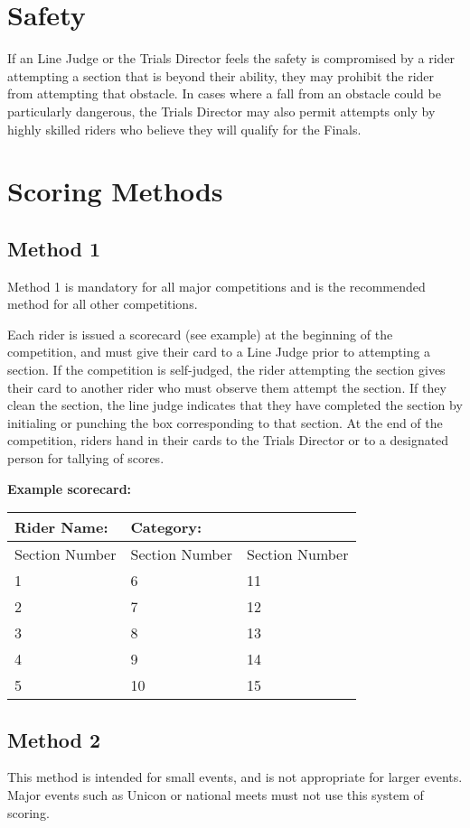 \section{Safety}

If an Line Judge or the Trials Director feels the safety is compromised by a rider attempting a section that is beyond their ability, they may prohibit the rider from attempting that obstacle.
In cases where a fall from an obstacle could be particularly dangerous, the Trials Director may also permit attempts only by highly skilled riders who believe they will qualify for the Finals.

\section{Scoring Methods}

\subsection{Method 1}
Method 1 is mandatory for all major competitions and is the recommended method for all other competitions.

Each rider is issued a scorecard (see example) at the beginning of the competition, and must give their card to a Line Judge prior to attempting a section.
If the competition is self-judged, the rider attempting the section gives their card to another rider who must observe them attempt the section.
If they clean the section, the line judge indicates that they have completed the section by initialing or punching the box corresponding to that section.
At the end of the competition, riders hand in their cards to the Trials Director or to a designated person for tallying of scores.

\textbf{Example scorecard:}

\begin{tabular}{|l|l|l|}
\hline
\textbf{Rider Name:} & \textbf{Category:} & \\
\hline
Section Number & Section Number & Section Number \\
\hline
1 & 6 & 11 \\
\hline
2 & 7 & 12 \\
\hline
3 & 8 & 13 \\
\hline
4 & 9 & 14 \\
\hline
5 & 10 & 15 \\
\hline
\end{tabular}

\subsection{Method 2}
This method is intended for small events, and is not appropriate for larger events.
Major events such as Unicon or national meets must not use this system of scoring.

